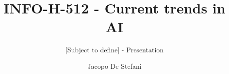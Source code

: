 \documentclass{beamer}
\author{Jacopo De Stefani}
\title{INFO-H-512 - Current trends in AI}
\subtitle{[Subject to define] - Presentation}
\institute{Universite' Libre de Bruxelles}
\begin{document}
\begin{frame}[t,plain]
\titlepage
\end{frame}

%
\end{document}
